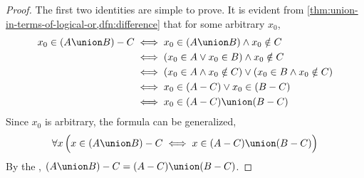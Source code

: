 \begin{proof}
    The first two identities are simple to prove. It is evident from
    \cref{thm:union-in-terms-of-logical-or,dfn:difference} that for
    some arbitrary \( x_{0} \),
    \begin{align*}
        x_{0} \in \mleft( A \union B \mright) - C
        &\iff
        x_{0} \in \mleft( A \union B \mright) \land x_{0} \notin C \\
        &\iff
        \mleft( x_{0} \in A \lor x_{0} \in B \mright) \land x_{0} \notin C \\
        &\iff
        \mleft( x_{0} \in A \land x_{0} \notin C \mright) \lor
        \mleft( x_{0} \in B \land x_{0} \notin C \mright) \\
        &\iff
        x_{0} \in \mleft( A - C \mright) \lor x_{0} \in \mleft( B - C \mright) \\
        &\iff
        x_{0} \in \mleft( A - C \mright) \union \mleft( B - C \mright)
    \end{align*}
    Since \( x_{0} \) is arbitrary, the formula can be generalized,
    \begin{equation*}
        \forall x \, \Big( x \in \mleft( A \union B \mright) - C
        \iff
        x \in \mleft( A - C \mright) \union \mleft( B - C \mright)  \Big)
    \end{equation*}
    By the , \( \mleft( A \union B \mright) - C = \mleft( A - C \mright) \union \mleft( B - C \mright) \).


\end{proof}
